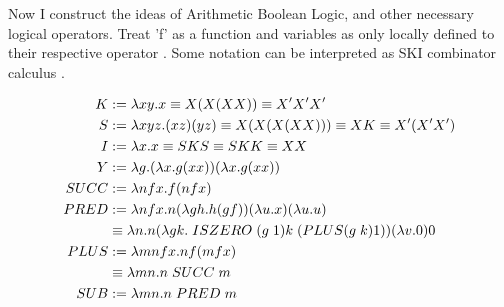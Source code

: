 Now I construct the ideas of Arithmetic Boolean Logic, and other necessary logical operators.
Treat 'f' as a function and variables as only locally defined to their respective operator \cite{LambdaFuncsList}.
Some notation can be interpreted as SKI combinator calculus \cite{SKICalcWiki}.


\[
    \begin{aligned}
        K &:= \lambda xy. x \equiv X(X (X X)) \equiv X' X' X'\\
        S &:= \lambda xyz. (x z) (y z) \equiv X (X (X (X X))) \equiv X K \equiv X' (X' X')\\
        I &:= \lambda x. x \equiv S K S \equiv S K K \equiv X X\\
        Y &:= \lambda g. (\lambda x. g (x x)) (\lambda x. g (x x))\\
        SUCC &:= \lambda nfx. f (n f x)\\
        PRED &:= \lambda n fx. n (\lambda gh. h(g f)) (\lambda u. x) (\lambda u. u)\\
            &\equiv \lambda n. n (\lambda gk. \hspace{0.1cm} ISZERO \hspace{0.1cm} (g \hspace{0.1cm} 1) k \hspace{0.1cm} (PLUS (g \hspace{0.1cm}k) 1))  (\lambda v. 0) 0\\
        PLUS &:= \lambda mnfx. n f (m f x)\\
            &\equiv \lambda mn. n \hspace{0.1cm} SUCC \hspace{0.1cm} m\\
        SUB &:= \lambda mn. n \hspace{0.1cm} PRED \hspace{0.1cm} m\\
    \end{aligned}
\]
